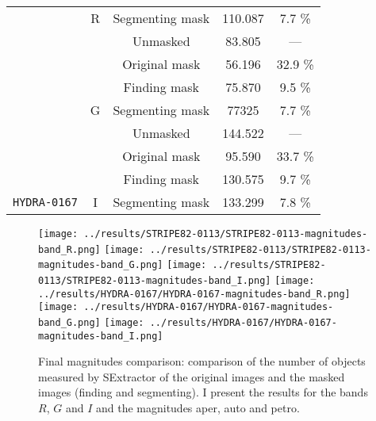 \documentclass{article}
\begin{document}
\begin{table}[h!]
\begin{tabular}{c|c|c|c|c}
    \cline{3-5}
    \cellcolor{gray!20} & \multirow{-4}{*}{\cellcolor{red!20}R} & Segmenting mask & 110.087 & 7.7 \%\\
    \cline{2-5}
    \cellcolor{gray!20} & \cellcolor{green!20} & Unmasked & 83.805 & --- \\
    \cline{3-5}
    \cellcolor{gray!20} & \cellcolor{green!20} & Original mask & 56.196 & 32.9 \%\\
    \cline{3-5}
    \cellcolor{gray!20} & \cellcolor{green!20} & Finding mask & 75.870 & 9.5 \%\\
    \cline{3-5}
    \cellcolor{gray!20} & \multirow{-4}{*}{\cellcolor{green!20}G} & Segmenting mask & 77325 & 7.7 \%\\
    \cline{2-5}
    \cellcolor{gray!20} & \cellcolor{blue!20} & Unmasked & 144.522 & --- \\
    \cline{3-5}
    \cellcolor{gray!20} & \cellcolor{blue!20} & Original mask & 95.590 & 33.7 \%\\
    \cline{3-5}
    \cellcolor{gray!20} & \cellcolor{blue!20} & Finding mask & 130.575 & 9.7 \%\\
    \cline{3-5}
    \multirow{-9}{*}{\cellcolor{gray!20}\texttt{HYDRA-0167}} & \multirow{-4}{*}{\cellcolor{blue!20}I} & Segmenting mask & 133.299 & 7.8 \%\\
    \hline
  \end{tabular}
  \label{tb:SExtractor_results}
\end{table}

\begin{figure}[h!]
  \centering
  \texttt{[image: ../results/STRIPE82-0113/STRIPE82-0113-magnitudes-band\_R.png]}
  \texttt{[image: ../results/STRIPE82-0113/STRIPE82-0113-magnitudes-band\_G.png]}
  \texttt{[image: ../results/STRIPE82-0113/STRIPE82-0113-magnitudes-band\_I.png]}
  \texttt{[image: ../results/HYDRA-0167/HYDRA-0167-magnitudes-band\_R.png]}
  \texttt{[image: ../results/HYDRA-0167/HYDRA-0167-magnitudes-band\_G.png]}
  \texttt{[image: ../results/HYDRA-0167/HYDRA-0167-magnitudes-band\_I.png]}
  \caption{Final magnitudes comparison: comparison of the number of objects measured by SExtractor of the original images and the masked images (finding and segmenting). I present the results for the bands $R$, $G$ and $I$ and the magnitudes aper, auto and petro.}
  \label{fig:final_magnitude_comparison}
\end{figure}

\end{document}
